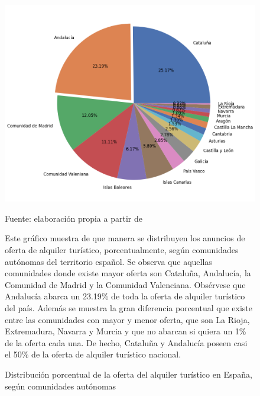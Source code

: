 \documentclass[a4paper,10pt]{article}
\begin{document}
            \begin{figure}[h]
                \begin{center}
                    \includegraphics*[width = 13cm]{graphics/spainccaadensity.png}
                    \begin{flushright}
                        \footnotesize{Fuente: elaboración propia a partir de \cite[(1)]{datahippo}}
                    \end{flushright}
                    \caption{Distribución porcentual de la oferta del alquiler turístico en España, según comunidades autónomas}
                \end{center}
            
                Este gráfico muestra de que manera se distribuyen los anuncios de oferta de alquiler turístico, porcentualmente,
                según comunidades autónomas del territorio español. Se observa que aquellas comunidades donde existe mayor oferta son
                Cataluña, Andalucía, la Comunidad de Madrid y la Comunidad Valenciana. Obsérvese que Andalucía abarca un 23.19\% de toda la 
                oferta de alquiler turístico del país. Además se muestra la gran diferencia porcentual que existe entre las comunidades 
                con mayor y menor oferta, que son La Rioja, Extremadura, Navarra y Murcia y que no abarcan si quiera un 1\% de la oferta cada una.
                De hecho, Cataluña y Andalucía poseen casi el 50\% de la oferta de alquiler turístico nacional.

            \end{figure}
\end{document}
